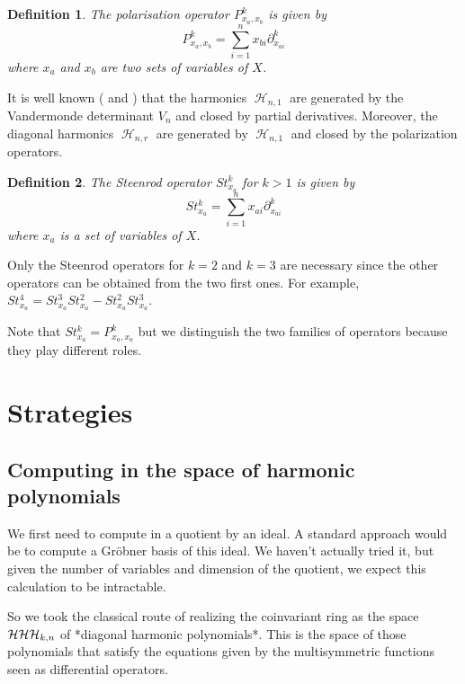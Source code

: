 \documentclass[letter,12pt]{article}
\newcommand{\pauline}[1]{\todo[linecolor=blue,backgroundcolor=blue!25,bordercolor=blue]{#1}}
\DeclareMathOperator{\harmonics}{\mathcal{H}}
\newtheorem{definition}{Definition}
\begin{document}
	\begin{definition}
		The \emph{polarisation operator} $P_{x_a,x_b}^k$ is given by
		$$P_{x_a,x_b}^k = \sum_{i=1}^{n} x_{bi} \partial_{x_{ai}}^k$$
		where $x_a$ and $x_b$ are two sets of variables of $X$. 
	\end{definition}

	It is well known (\cite{Haiman2002} and \cite{Bergeron2009}) that the harmonics $\harmonics_{n,1}$ are generated by the Vandermonde determinant $V_n$ and closed by partial derivatives. Moreover, the diagonal harmonics $\harmonics_{n,r}$ are generated by $\harmonics_{n,1}$ and closed by the polarization operators. 
	
	\begin{definition} \pauline{how to introduce them ?}
		The \emph{Steenrod operator} $St_{x_a}^k$ for $k>1$ is given by
		$$St_{x_a}^k = \sum_{i=1}^{n} x_{ai} \partial_{x_{ai}}^k$$
		where $x_a$ is a set of variables of $X$. 
	\end{definition}

	Only the Steenrod operators for $k=2$ and $k=3$ are necessary since the other operators can be obtained from the two first ones. For example, $St_{x_a}^4 = St_{x_a}^3St_{x_a}^2 - St_{x_a}^2St_{x_a}^3$. 

	Note that $St_{x_a}^k = P_{x_a,x_a}^k$ but we distinguish the two families of operators because they play different roles. 
	
	\section{Strategies}
	
	\subsection{Computing in the space of harmonic polynomials}
	
	We first need to compute in a quotient by an ideal.
	A standard approach would be to compute a Gröbner basis of this ideal.
	We haven't actually tried it, but given the number of variables and dimension of the quotient, we expect this calculation to be intractable.
	
	So we took the classical route of realizing the coinvariant ring as the space $\def\harmonics{\mathcal{H}}\harmonics_{k,n}$ of *diagonal harmonic polynomials*.
	This is the space of those polynomials that satisfy the equations given by the multisymmetric functions seen as differential operators.
	
\end{document}
